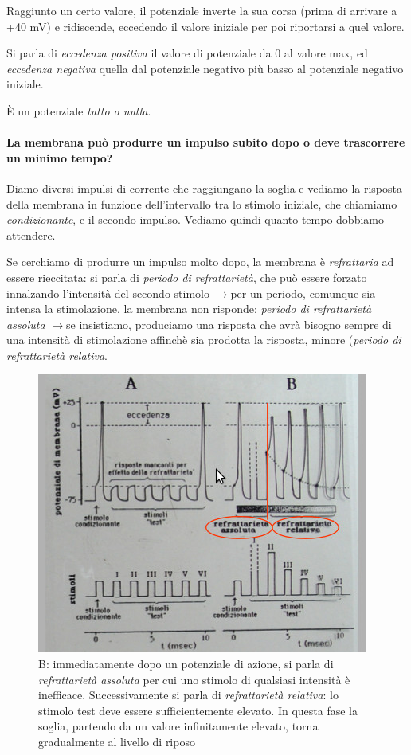 \documentclass[a4paper,12pt]{article}
\newcommand{\lfreccia}{\ensuremath{\longrightarrow}}
\begin{document}
Raggiunto un certo valore, il potenziale inverte la sua corsa (prima di arrivare a +40 mV) e ridiscende, eccedendo il valore iniziale per poi riportarsi a quel valore.

Si parla di \emph{eccedenza positiva} il valore di potenziale da 0 al valore max, ed \emph{eccedenza negativa} quella dal potenziale negativo più basso al potenziale negativo iniziale.

È un potenziale \emph{tutto o nulla}. 

\paragraph{La membrana può produrre un impulso subito dopo o deve trascorrere un minimo tempo?}

Diamo diversi impulsi di corrente che raggiungano la soglia e vediamo la risposta della membrana in funzione dell'intervallo tra lo stimolo iniziale, che chiamiamo \emph{condizionante}, e il secondo impulso. Vediamo quindi quanto tempo dobbiamo attendere.

Se cerchiamo di produrre un impulso molto dopo, la membrana è \emph{refrattaria} ad essere rieccitata: si parla di \emph{periodo di refrattarietà}, che può essere forzato innalzando l'intensità del secondo stimolo \lfreccia per un periodo, comunque sia intensa la stimolazione, la membrana non risponde: \emph{periodo di refrattarietà assoluta} \lfreccia se insistiamo, produciamo una risposta che avrà bisogno sempre di una intensità di stimolazione affinchè sia prodotta la risposta, minore (\emph{periodo di refrattarietà relativa}.
\begin{figure}[H]
\centering
\includegraphics[scale=0.5]{immagine/refrattarieta.jpg}
\caption{B: immediatamente dopo un potenziale di azione, si parla di \emph{refrattarietà assoluta} per cui uno stimolo di qualsiasi intensità è inefficace. Successivamente si parla di \emph{refrattarietà relativa}: lo stimolo test deve essere sufficientemente elevato. In questa fase la soglia, partendo da un valore infinitamente elevato, torna gradualmente al livello di riposo}
\end{figure}
\end{document}
